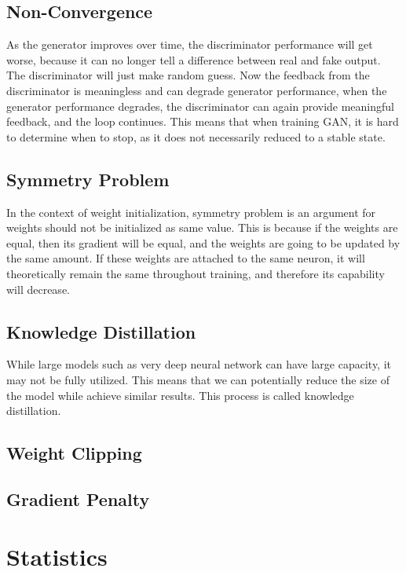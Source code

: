 \section{Non-Convergence}
\label{app:ml:non_conv}
As the generator improves over time, the discriminator performance will get worse, because it can no longer tell a difference between real and fake output. The discriminator will just make random guess. Now the feedback from the discriminator is meaningless and can degrade generator performance, when the generator performance degrades, the discriminator can again provide meaningful feedback, and the loop continues. This means that when training GAN, it is hard to determine when to stop, as it does not necessarily reduced to a stable state.

\section{Symmetry Problem}
\label{app:ml:sym}
In the context of weight initialization, symmetry problem is an argument for weights should not be initialized as same value. This is because if the weights are equal, then its gradient will be equal, and the weights are going to be updated by the same amount. If these weights are attached to the same neuron, it will theoretically remain the same throughout training, and therefore its capability will decrease.

\section{Knowledge Distillation}
\label{app:ml:kd}
While large models such as very deep neural network can have large capacity, it may not be fully utilized. This means that we can potentially reduce the size of the model while achieve similar results. This process is called knowledge distillation.

\section{Weight Clipping}
\label{app:ml:weight_clip}

\section{Gradient Penalty}
\label{app:ml:grad_pen}


\chapter{Statistics}
\label{app:stat}

